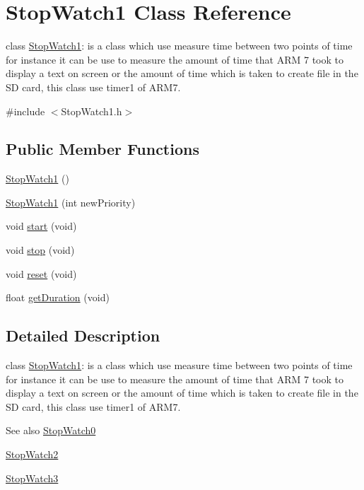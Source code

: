 \hypertarget{class_stop_watch1}{
\section{StopWatch1 Class Reference}
\label{dd/d83/class_stop_watch1}
}


class \hyperlink{class_stop_watch1}{StopWatch1}: is a class which use measure time between two points of time for instance it can be use to measure the amount of time that ARM 7 took to display a text on screen or the amount of time which is taken to create file in the SD card, this class use timer1 of ARM7.  




{\ttfamily \#include $<$StopWatch1.h$>$}

\subsection*{Public Member Functions}
\begin{DoxyCompactItemize}
\item 
\hyperlink{class_stop_watch1_a32ea8f18f33abc8c12d2d3240d0c05bd}{StopWatch1} ()
\item 
\hyperlink{class_stop_watch1_a7897795aab816f5cee62eaafcd0615de}{StopWatch1} (int newPriority)
\item 
void \hyperlink{class_stop_watch1_a0bee387e1784d1731703a16661ff47bb}{start} (void)
\item 
void \hyperlink{class_stop_watch1_a93736e1be2c32a13b7a20a1a19809480}{stop} (void)
\item 
void \hyperlink{class_stop_watch1_a3676c3234e357cd3dabe89a578df8716}{reset} (void)
\item 
float \hyperlink{class_stop_watch1_a2dca9c012a952a2ddcef6011fb6a7d54}{getDuration} (void)
\end{DoxyCompactItemize}


\subsection{Detailed Description}
class \hyperlink{class_stop_watch1}{StopWatch1}: is a class which use measure time between two points of time for instance it can be use to measure the amount of time that ARM 7 took to display a text on screen or the amount of time which is taken to create file in the SD card, this class use timer1 of ARM7. 

\begin{DoxySeeAlso}{See also}
\hyperlink{class_stop_watch0}{StopWatch0} 

\hyperlink{class_stop_watch2}{StopWatch2} 

\hyperlink{class_stop_watch3}{StopWatch3} 
\end{DoxySeeAlso}


